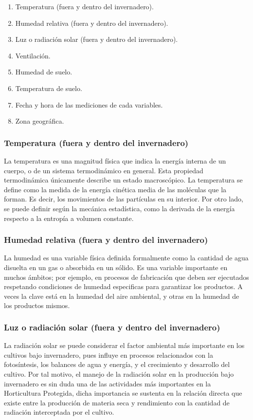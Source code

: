 \begin{enumerate}\itemsep=-0.5em
    \item Temperatura (fuera y dentro del invernadero).
    \item Humedad relativa (fuera y dentro del invernadero).
    \item Luz o radiación solar (fuera y dentro del invernadero).
    \item Ventilación.
    \item Humedad de suelo.
    \item Temperatura de suelo.
    \item Fecha y hora de las mediciones de cada variables.  
    \item Zona geográfica. 
\end{enumerate}
\subsubsection{Temperatura (fuera y dentro del invernadero)}
La temperatura es una magnitud física que indica la energía interna de un
cuerpo, o de un sistema termodinámico en general. Esta propiedad termodinámica
únicamente describe un estado macroscópico.
La temperatura se define como la medida de la energía cinética media de las
moléculas que la forman. Es decir, los movimientos de las partículas en su
interior.
Por otro lado, se puede definir según la mecánica estadística, como la derivada
de la energía respecto a la entropía a volumen constante.

\subsubsection{Humedad relativa (fuera y dentro del invernadero)}

La humedad es una variable física definida formalmente como la cantidad de agua
disuelta en un gas o absorbida en un sólido.  Es una variable importante en
muchos ámbitos; por ejemplo, en procesos de fabricación que deben ser
ejecutados respetando condiciones de humedad especificas para garantizar los
productos. A veces la clave está en la humedad del aire ambiental, y otras en
la humedad de los productos mismos. 
\subsubsection{Luz o radiación solar (fuera y dentro del invernadero)}

La radiación solar se puede considerar el factor ambiental más importante en
los cultivos bajo invernadero, pues influye en procesos relacionados con la
fotosíntesis, los balances de agua y energía, y el crecimiento y desarrollo del
cultivo. Por tal motivo, el manejo de la radiación solar en la producción bajo
invernadero es sin duda una de las actividades más importantes en la
Horticultura Protegida, dicha importancia se sustenta en la relación directa
que existe entre la producción de materia seca y rendimiento con la cantidad de
radiación interceptada por el cultivo. 

